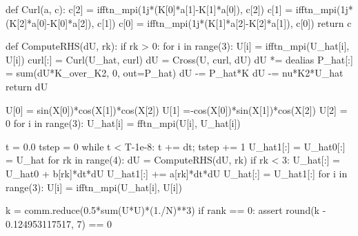 \documentclass[11pt, oneside]{article}
\begin{document}
\begin{python}
def Curl(a, c):
    c[2] = ifftn_mpi(1j*(K[0]*a[1]-K[1]*a[0]), c[2])
    c[1] = ifftn_mpi(1j*(K[2]*a[0]-K[0]*a[2]), c[1])
    c[0] = ifftn_mpi(1j*(K[1]*a[2]-K[2]*a[1]), c[0])
    return c

def ComputeRHS(dU, rk):
    if rk > 0:
        for i in range(3):
            U[i] = ifftn_mpi(U_hat[i], U[i])
    curl[:] = Curl(U_hat, curl)
    dU = Cross(U, curl, dU)
    dU *= dealias
    P_hat[:] = sum(dU*K_over_K2, 0, out=P_hat)
    dU -= P_hat*K
    dU -= nu*K2*U_hat
    return dU

U[0] = sin(X[0])*cos(X[1])*cos(X[2])
U[1] =-cos(X[0])*sin(X[1])*cos(X[2])
U[2] = 0
for i in range(3):
    U_hat[i] = fftn_mpi(U[i], U_hat[i])

t = 0.0
tstep = 0
while t < T-1e-8:
    t += dt; tstep += 1
    U_hat1[:] = U_hat0[:] = U_hat
    for rk in range(4):
        dU = ComputeRHS(dU, rk)
        if rk < 3: U_hat[:] = U_hat0 + b[rk]*dt*dU
        U_hat1[:] += a[rk]*dt*dU
    U_hat[:] = U_hat1[:]
    for i in range(3):
        U[i] = ifftn_mpi(U_hat[i], U[i])

k = comm.reduce(0.5*sum(U*U)*(1./N)**3)
if rank == 0:
    assert round(k - 0.124953117517, 7) == 0

\end{python}
\end{document}
